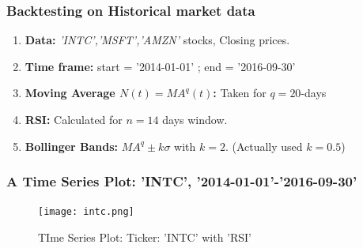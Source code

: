 \documentclass[slidestop,compress,mathserif,9pt]{beamer}
\def\be{\begin{enumerate}}
\def\ee{\end{enumerate}}
\begin{document}
\begin{frame}

\frametitle{Backtesting on Historical market data}
\be
\item
\textbf{Data:} \emph{'INTC','MSFT','AMZN'} stocks, Closing prices.
\item
\textbf{Time frame:} start = '2014-01-01' ; end = '2016-09-30'
\item
\textbf{Moving Average $N(t) = MA^q(t)$:} Taken for $q=20$-days
\item
\textbf{RSI:} Calculated for $n=14$ days window.
\item
\textbf{Bollinger Bands:} $MA^q \pm k\sigma$ with $k=2$. (Actually used $k=0.5$)


\ee

\end{frame}


\begin{frame}

\frametitle{A Time Series Plot: 'INTC', '2014-01-01'-'2016-09-30'}

\begin{figure}
\texttt{[image: intc.png]}
\caption{TIme Series Plot: Ticker: 'INTC' with 'RSI'}
\end{figure}





\end{frame}
\end{document}
